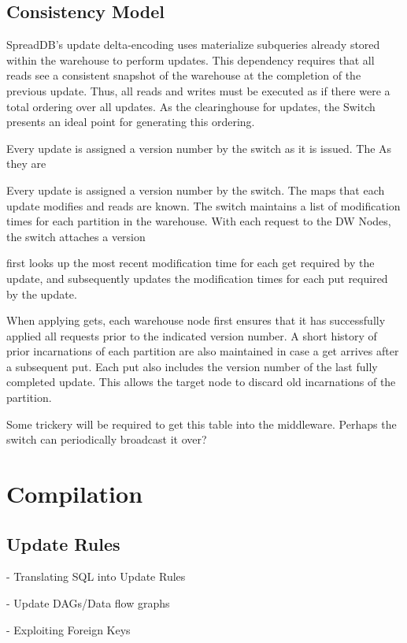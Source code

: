 \documentclass{sig-alternate}
\begin{document}
\subsection{Consistency Model}

SpreadDB's update delta-encoding uses materialize subqueries already stored within the warehouse to perform updates.  This dependency requires that all reads see a consistent snapshot of the warehouse at the completion of the previous update.  Thus, all reads and writes must be executed as if there were a total ordering over all updates.  As the clearinghouse for updates, the Switch presents an ideal point for generating this ordering.  

Every update is assigned a version number by the switch as it is issued.  The 
As they are 

Every update is assigned a version number by the switch.  The maps that each update modifies and reads are known.  The switch maintains a list of modification times for each partition in the warehouse.  With each request to the DW Nodes, the switch attaches a version 

 first looks up the most recent modification time for each get required by the update, and subsequently updates the modification times for each put required by the update.  

When applying gets, each warehouse node first ensures that it has successfully applied all requests prior to the indicated version number.  A short history of prior incarnations of each partition are also maintained in case a get arrives after a subsequent put.  Each put also includes the version number of the last fully completed update.  This allows the target node to discard old incarnations of the partition.

Some trickery will be required to get this table into the middleware.  Perhaps the switch can periodically broadcast it over?

\section{Compilation}
\label{sec:compilation}

\subsection{Update Rules}
- Translating SQL into Update Rules

- Update DAGs/Data flow graphs

- Exploiting Foreign Keys
\end{document}
